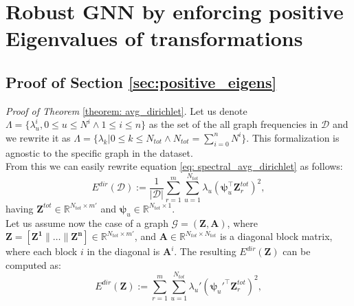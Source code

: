 \documentclass[twoside]{article}
\theoremstyle{definition}
\begin{document}





\section{Robust GNN by enforcing positive Eigenvalues of transformations }
\subsection{Proof of Section \ref{sec:positive_eigens}}
\label{app: proof}
\textit{Proof of Theorem} \ref{theorem: avg_dirichlet}. Let us denote $\Lambda = \{\lambda_u^i, 0 \leq u \leq N^i \wedge 1 \leq i \leq n\}$ as the set of the all graph frequencies in $\mathcal{D}$ and we rewrite it as $\Lambda = \{\lambda_k | 0 \leq k \leq N_{tot} \wedge N_{tot} = \sum_{i = 0}^{n} N^i\}$. This formalization is agnostic to the specific graph in the dataset. \\
From this we can easily rewrite equation \eqref{eq: spectral_avg_dirichlet} as follows:
\begin{equation}
\label{eq: spectral_avg_dirichlet_onegraph}
   E^{dir}(\mathcal{D}) := \frac{1}{|\mathcal{D}|} \sum_{r = 1}^{m} \sum_{u = 1}^{N_{tot}} \lambda_u(\bm{\psi}_u^{\top} \mathbf{Z}^{tot}_{r})^2,
\end{equation}
having $\mathbf{Z}^{tot} \in \mathbb{R}^{N_{tot} \times m'}$ and $\bm{\psi}_u \in \mathbb{R}^{N_{tot} \times 1}$. \\
Let us assume now the case of a graph $\mathcal{G} = (\mathbf{Z}, \mathbf{A})$, where $\mathbf{Z} = [\mathbf{Z^1} \|\ldots \| \mathbf{Z^n}] \in \mathbb{R}^{N_{tot} \times m'}$, and $\mathbf{A} \in \mathbb{R}^{N_{tot} \times N_{tot}}$ is a diagonal block matrix, where each block $i$ in the diagonal is $\mathbf{A}^i$. The resulting $E^{dir}(\mathbf{Z})$ can be computed as: 
\begin{equation}
\label{eq: spectral_dirichlet_onegraph}
   E^{dir}(\mathbf{Z}) := \sum_{r = 1}^{m} \sum_{u = 1}^{N_{tot}} \lambda_u'(\bm{\psi}_u'^{\top} \mathbf{Z}^{tot}_{r})^2,
\end{equation}
\end{document}
